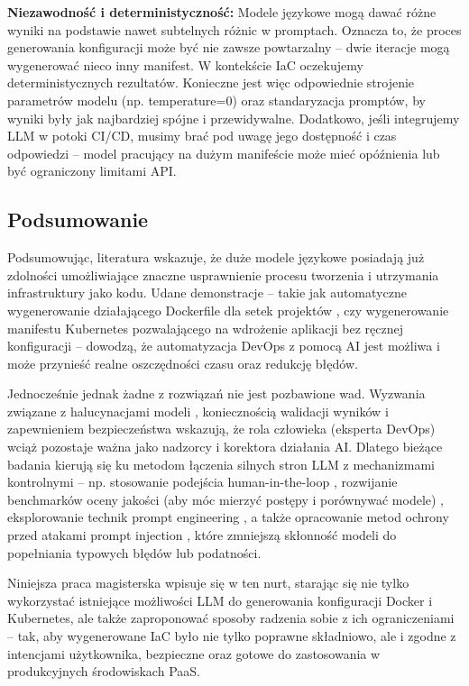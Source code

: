 \textbf{Niezawodność i deterministyczność:} Modele językowe mogą dawać różne wyniki na podstawie nawet subtelnych różnic w promptach. Oznacza to, że proces generowania konfiguracji może być nie zawsze powtarzalny – dwie iteracje mogą wygenerować nieco inny manifest. W kontekście IaC oczekujemy deterministycznych rezultatów. Konieczne jest więc odpowiednie strojenie parametrów modelu (np. temperature=0) oraz standaryzacja promptów, by wyniki były jak najbardziej spójne i przewidywalne. Dodatkowo, jeśli integrujemy LLM w potoki CI/CD, musimy brać pod uwagę jego dostępność i czas odpowiedzi – model pracujący na dużym manifeście może mieć opóźnienia lub być ograniczony limitami API.

\subsection{Podsumowanie}

Podsumowując, literatura wskazuje, że duże modele językowe posiadają już zdolności umożliwiające znaczne usprawnienie procesu tworzenia i utrzymania infrastruktury jako kodu. Udane demonstracje – takie jak automatyczne wygenerowanie działającego Dockerfile dla setek projektów \cite{hu_llm-based_2025}, czy wygenerowanie manifestu Kubernetes pozwalającego na wdrożenie aplikacji bez ręcznej konfiguracji \cite{kratzke_dont_2024} – dowodzą, że automatyzacja DevOps z pomocą AI jest możliwa i może przynieść realne oszczędności czasu oraz redukcję błędów.

Jednocześnie jednak żadne z rozwiązań nie jest pozbawione wad. Wyzwania związane z halucynacjami modeli \cite{low_repairing_2024}, koniecznością walidacji wyników \cite{ueno_migrating_2024, kon_iac-eval_nodate} i zapewnieniem bezpieczeństwa \cite{malul_genkubesec_2024, fu_security_2025} wskazują, że rola człowieka (eksperta DevOps) wciąż pozostaje ważna jako nadzorcy i korektora działania AI. Dlatego bieżące badania kierują się ku metodom łączenia silnych stron LLM z mechanizmami kontrolnymi – np. stosowanie podejścia human-in-the-loop \cite{low_repairing_2024}, rozwijanie benchmarków oceny jakości (aby móc mierzyć postępy i porównywać modele) \cite{ueno_migrating_2024, kon_iac-eval_nodate}, eksplorowanie technik prompt engineering \cite{kratzke_dont_2024, pujar_invited_2023}, a także opracowanie metod ochrony przed atakami prompt injection \cite{liu_prompt_2024}, które zmniejszą skłonność modeli do popełniania typowych błędów lub podatności.

Niniejsza praca magisterska wpisuje się w ten nurt, starając się nie tylko wykorzystać istniejące możliwości LLM do generowania konfiguracji Docker i Kubernetes, ale także zaproponować sposoby radzenia sobie z ich ograniczeniami – tak, aby wygenerowane IaC było nie tylko poprawne składniowo, ale i zgodne z intencjami użytkownika, bezpieczne oraz gotowe do zastosowania w produkcyjnych środowiskach PaaS.